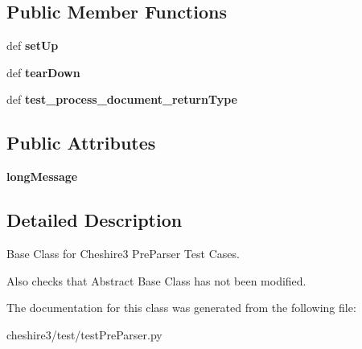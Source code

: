 \subsection*{Public Member Functions}
\begin{DoxyCompactItemize}
\item 
\hypertarget{classcheshire3_1_1test_1_1test_pre_parser_1_1_pre_parser_test_case_a680e8c9a3e53707fa4270771b9d88a3b}{def {\bfseries set\-Up}}\label{classcheshire3_1_1test_1_1test_pre_parser_1_1_pre_parser_test_case_a680e8c9a3e53707fa4270771b9d88a3b}

\item 
\hypertarget{classcheshire3_1_1test_1_1test_pre_parser_1_1_pre_parser_test_case_a2724b055a86308056c8f0d1d85f9b24f}{def {\bfseries tear\-Down}}\label{classcheshire3_1_1test_1_1test_pre_parser_1_1_pre_parser_test_case_a2724b055a86308056c8f0d1d85f9b24f}

\item 
\hypertarget{classcheshire3_1_1test_1_1test_pre_parser_1_1_pre_parser_test_case_abdcfb7029afff32a8df99f83dd11557f}{def {\bfseries test\-\_\-process\-\_\-document\-\_\-return\-Type}}\label{classcheshire3_1_1test_1_1test_pre_parser_1_1_pre_parser_test_case_abdcfb7029afff32a8df99f83dd11557f}

\end{DoxyCompactItemize}
\subsection*{Public Attributes}
\begin{DoxyCompactItemize}
\item 
\hypertarget{classcheshire3_1_1test_1_1test_pre_parser_1_1_pre_parser_test_case_ad2565224fab52ced5262fde84b04d234}{{\bfseries long\-Message}}\label{classcheshire3_1_1test_1_1test_pre_parser_1_1_pre_parser_test_case_ad2565224fab52ced5262fde84b04d234}

\end{DoxyCompactItemize}


\subsection{Detailed Description}
\begin{DoxyVerb}Base Class for Cheshire3 PreParser Test Cases.

Also checks that Abstract Base Class has not been modified.
\end{DoxyVerb}
 

The documentation for this class was generated from the following file\-:\begin{DoxyCompactItemize}
\item 
cheshire3/test/test\-Pre\-Parser.\-py\end{DoxyCompactItemize}
